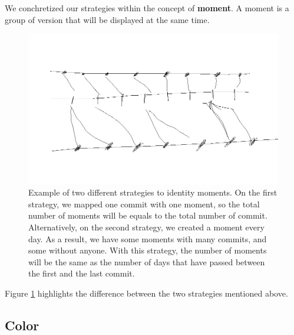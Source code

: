 We conchretized our strategies within the concept of \textbf{moment}. A moment is a group of version that will be displayed at the same time. 


\begin{figure}[H]
    \begin{center}
        \includegraphics[width=0.9\linewidth]{Moments.jpg} 
        \caption{Example of two different strategies to identity moments. 
        On the first strategy, we mapped one commit with one moment, so the total number of moments will be equals to the total number of commit.  
        Alternatively, on the second strategy, we created a moment every day.
        As a result, we have some moments with many commits, and some without anyone.
        With this strategy, the number of moments will be the same as the number of days that have passed between the first and the last commit. 
        }
        \label{fig:moment}
    \end{center}
\end{figure}

Figure \ref{fig:moment} highlights the difference between the two strategies mentioned above. 


\subsection*{Color}


